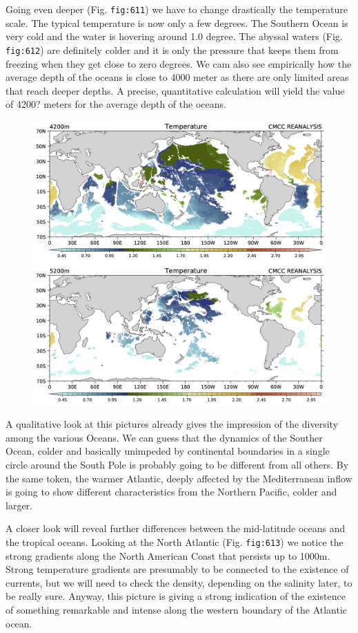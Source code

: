 Going even deeper (Fig. \texttt{fig:611}) we have to change drastically
the temperature scale. The typical temperature is now only a few
degrees. The Southern Ocean is very cold and the water is hovering
around 1.0 degree. The abyssal waters (Fig. \texttt{fig:612}) are
definitely colder and it is only the pressure that keeps them from
freezing when they get close to zero degrees. We cam also see
empirically how the average depth of the oceans is close to 4000 meter
as there are only limited areas that reach deeper depths. A precise,
quantitative calculation will yield the value of 4200? meters for the
average depth of the oceans.

\begin{figure}
\centering
\includegraphics[width = .7 \textwidth]{figs/GD/Temp4200-5200.png}
\caption{} \label{fig:}
\end{figure}

A qualitative look at this pictures already gives the impression of the
diversity among the various Oceans. We can guess that the dynamics of
the Souther Ocean, colder and basically unimpeded by continental
boundaries in a single circle around the South Pole is probably going to
be different from all others. By the same token, the warmer Atlantic,
deeply affected by the Mediterranean inflow is going to show different
characteristics from the Northern Pacific, colder and larger.

A closer look will reveal further differences between the mid-latitude
oceans and the tropical oceans. Looking at the North Atlantic (Fig.
\texttt{fig:613}) we notice the strong gradients along the North
American Coast that persists up to 1000m. Strong temperature gradients
are presumably to be connected to the existence of currents, but we will
need to check the density, depending on the salinity later, to be really
sure. Anyway, this picture is giving a strong indication of the
existence of something remarkable and intense along the western boundary
of the Atlantic ocean.

